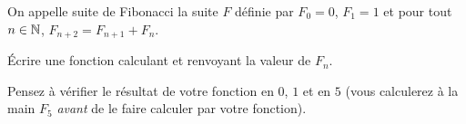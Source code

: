 \question On appelle suite de Fibonacci la suite $F$ définie par
$F_{0}=0$, $F_{1}=1$ et pour tout $n\in\mathbb{N}$, $F_{n+2} = F_{n+1} + F_{n}$.

Écrire une fonction  calculant et renvoyant la valeur de $F_{n}$.

Pensez à vérifier le résultat de votre fonction en $0$, $1$ et en $5$
(vous calculerez à la main $F_{5}$ \emph{avant} de le faire calculer
par votre fonction).